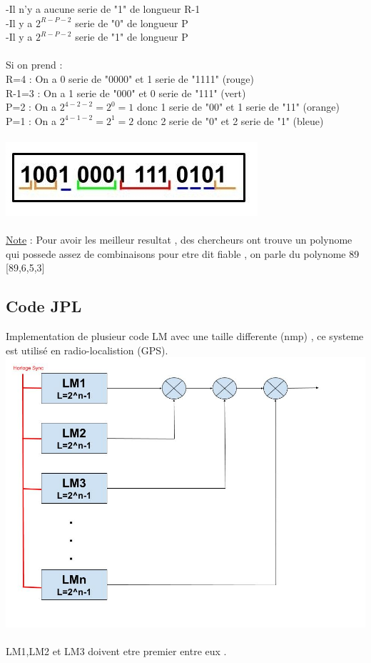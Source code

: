 \documentclass[a4paper,8pt,openany]{book}
\begin{document}
-Il n'y a aucune serie de "1" de longueur R-1\\
-Il y a  $2^{R-P-2}$ serie de "0" de longueur P\\
-Il y a $2^{R-P-2}$ serie de "1" de longueur P\\
\\
Si on prend :\\
R=4 : On a 0 serie de "0000" et 1 serie de "1111" (rouge)\\
R-1=3 : On a 1 serie de "000" et 0 serie de "111" (vert)\\
P=2 : On a $2^{4-2-2}=2^0=1$ donc 1 serie de "00" et 1 serie de "11" (orange)\\
P=1 : On a $2^{4-1-2}=2^1=2$ donc 2 serie de "0" et 2 serie de "1" (bleue)\\
\\
\includegraphics[width=0.5\linewidth,center]{img/registre_decalage_exemple.jpg}\\
\\

\underline{Note} : Pour avoir les meilleur resultat , des chercheurs ont trouve un polynome qui possede assez de combinaisons pour etre dit fiable , on parle du polynome 89 [89,6,5,3]\\




\subsection{Code JPL}
Implementation de plusieur code LM avec une taille differente (n\diff m\diff p) , ce systeme est utilis\'e en radio-localistion (GPS).\\
\includegraphics[width=0.75\linewidth,center]{img/code_JPL.jpg}\\
\\
LM1,LM2 et LM3 doivent etre premier entre eux .\\
\\
\end{document}
